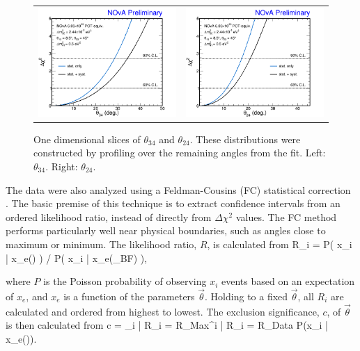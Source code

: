 \begin{figure}[htbp]
  \centering
  \begin{tabular}{c c}
    \includegraphics[width=.47\textwidth]{figures/Fits/1DTh34.png} &
    \includegraphics[width=.47\textwidth]{figures/Fits/1DTh24.png} \\
  \end{tabular}
  \caption[One Dimensional $\theta_{34}$ and $\theta_{24}$ Slices]{One dimensional slices of $\theta_{34}$ and $\theta_{24}$. These distributions were constructed by profiling over the remaining angles from the fit. Left: $\theta_{34}$. Right: $\theta_{24}$.}
  \label{fig:Fit1D}
\end{figure}

The data were also analyzed using a Feldman-Cousins (FC) statistical correction \cite{ref:FC}. The basic pre\-mise of this technique is to extract confidence intervals from an ordered likelihood ratio, instead of directly from $\Delta\chi^2$ values. The FC method performs particularly well near physical boundaries, such as angles close to maximum or minimum. The likelihood ratio, $R$, is calculated from
\beq
R_{i} = P\left( x_i | x_e\left(\vec{\theta}\right) \right) / P\left( x_i | x_e\left(\vec{\theta}_{BF}\right) \right),
\label{eq:FCRank}
\eeq

\n where $P$ is the Poisson probability of observing $x_i$ events based on an expectation of $x_e$, and $x_e$ is a function of the parameters $\vec{\theta}$. Holding to a fixed $\vec{\theta}$, all $R_i$ are calculated and ordered from highest to lowest. The exclusion significance, $c$, of $\vec{\theta}$ is then calculated from
\beq
c = \sum_{i | R_i = R_{Max}}^{i | R_i = R_{Data}} P\left(x_i | x_e\left(\vec{\theta}\right)\right).
\label{eq:FCConf}
\eeq

